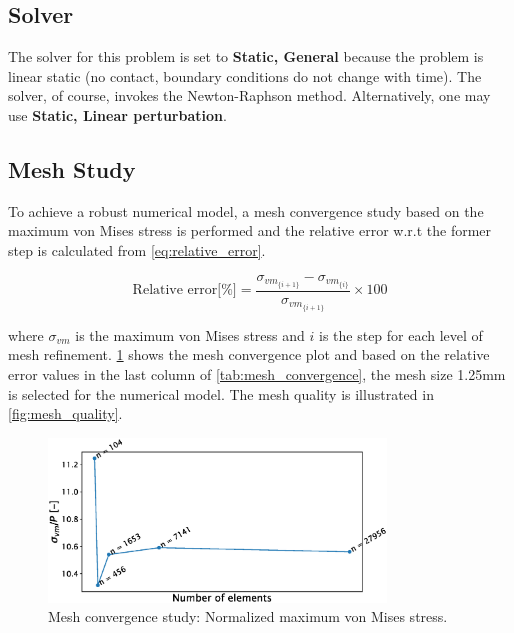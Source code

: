 \documentclass{article}
\begin{document}
\subsection{Solver}
The solver for this problem is set to \textbf{Static, General} because the problem is linear static (no contact, boundary conditions do not change with time). The solver, of course, invokes the Newton-Raphson method. Alternatively, one may use \textbf{Static, Linear perturbation}.

\subsection{Mesh Study}
To achieve a robust numerical model, a mesh convergence study based on the maximum von Mises stress is performed and the relative error w.r.t the former step is calculated from \cref{eq:relative_error}.

\begin{equation}
    \text{Relative error[\%]} = \frac{\sigma_{vm_{\{i+1\}}} - \sigma_{vm_{\{i\}}}}{\sigma_{vm_{\{i+1\}}}} \times 100
    \label{eq:relative_error}
\end{equation}

where $\sigma_{vm}$ is the maximum von Mises stress and $i$ is the step for each level of mesh refinement. \cref{fig:mesh_convergence} shows the mesh convergence plot and based on the relative error values in the last column of \cref{tab:mesh_convergence}, the mesh size 1.25mm is selected for the numerical model. The mesh quality is illustrated in \cref{fig:mesh_quality}.

\begin{figure}[H]
    \centering
    \includegraphics[width = 0.8\textwidth ]{figures/mesh_convergence.eps}
    \caption{Mesh convergence study: Normalized maximum von Mises stress.}
    \label{fig:mesh_convergence}
\end{figure}
\end{document}
